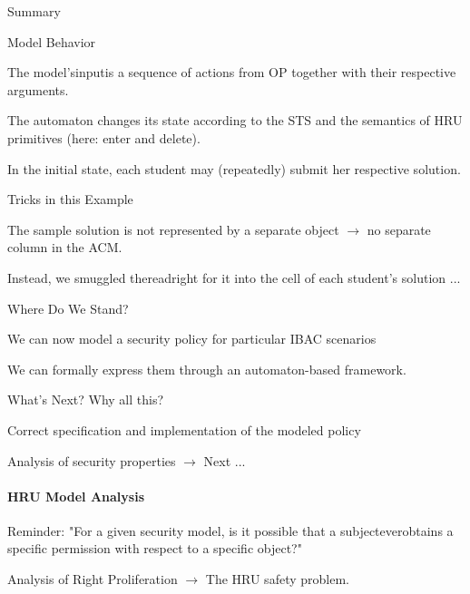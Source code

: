 \documentclass[a4paper]{article}
\begin{document}
\begin{multicols}{3}
    Summary
    \begin{itemize*}
        \item Model Behavior
              \begin{itemize*}
                  \item The model’sinputis a sequence of actions from OP together with their respective arguments.
                  \item The automaton changes its state according to the STS and the semantics of HRU primitives (here: enter and delete).
                  \item In the initial state, each student may (repeatedly) submit her respective solution.
              \end{itemize*}
        \item Tricks in this Example
              \begin{itemize*}
                  \item The sample solution is not represented by a separate object $\rightarrow$  no separate column in the ACM.
                  \item Instead, we smuggled thereadright for it into the cell of each student’s solution ...
              \end{itemize*}
        \item Where Do We Stand?
              \begin{itemize*}
                  \item We can now model a security policy for particular IBAC scenarios
                  \item We can formally express them through an automaton-based framework.
              \end{itemize*}
        \item What’s Next? Why all this?
              \begin{itemize*}
                  \item Correct specification and implementation of the modeled policy
                  \item Analysis of security properties $\rightarrow$  Next ...
              \end{itemize*}
    \end{itemize*}

    \paragraph{HRU Model Analysis}
    \begin{itemize*}
        \item Reminder: "For a given security model, is it possible that a subjecteverobtains a specific permission with respect to a specific object?"
        \item Analysis of Right Proliferation $\rightarrow$  The HRU safety problem.
    \end{itemize*}


\end{multicols}
\end{document}
